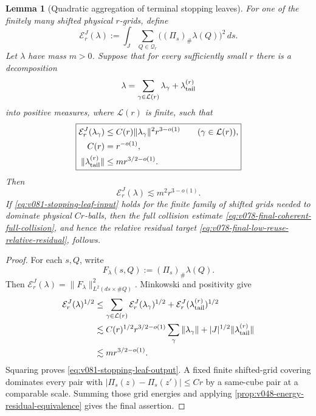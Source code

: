 \documentclass[10pt]{article}
\newtheorem{lemma}[theorem]{Lemma}
\begin{document}
\begin{lemma}[Quadratic aggregation of terminal stopping leaves]
\label{lem:v081-stopping-leaf-quadratic-aggregation}
For one of the finitely many shifted physical \(r\)-grids, define
\[
\mathcal E_r^J(\lambda)
:=
\int_J\sum_{Q\in\mathcal Q_r}
\bigl((\Pi_s)_\#\lambda(Q)\bigr)^2\,ds.
\]
Let \(\lambda\) have mass \(m>0\).  Suppose that for every sufficiently small \(r\) there is a
decomposition
\[
\lambda=\sum_{\gamma\in\mathcal L(r)}\lambda_\gamma+\lambda_{\rm tail}^{(r)}
\]
into positive measures, where \(\mathcal L(r)\) is finite, such that
\begin{equation}
\label{eq:v081-stopping-leaf-input}
\boxed{
\begin{aligned}
\mathcal E_r^J(\lambda_\gamma)
&\le
C(r)\|\lambda_\gamma\|^2r^{3-o(1)}
\qquad(\gamma\in\mathcal L(r)),\\
C(r)&=r^{-o(1)},\\
\|\lambda_{\rm tail}^{(r)}\|
&\le
mr^{3/2-o(1)}.
\end{aligned}
}
\end{equation}
Then
\begin{equation}
\label{eq:v081-stopping-leaf-output}
\boxed{
\mathcal E_r^J(\lambda)
\lesssim
m^2r^{3-o(1)}.
}
\end{equation}
If \eqref{eq:v081-stopping-leaf-input} holds for the finite family of shifted grids needed to
dominate physical \(Cr\)-balls, then the full collision estimate
\eqref{eq:v078-final-coherent-full-collision}, and hence the relative residual target
\eqref{eq:v078-final-low-reuse-relative-residual}, follows.
\end{lemma}

\begin{proof}
For each \(s,Q\), write
\[
F_\lambda(s,Q):=(\Pi_s)_\#\lambda(Q).
\]
Then \(\mathcal E_r^J(\lambda)=\|F_\lambda\|_{L^2(ds\times\#Q)}^2\).
Minkowski and positivity give
\[
\begin{aligned}
\mathcal E_r^J(\lambda)^{1/2}
&\le
\sum_{\gamma\in\mathcal L(r)}
\mathcal E_r^J(\lambda_\gamma)^{1/2}
+
\mathcal E_r^J(\lambda_{\rm tail}^{(r)})^{1/2}\\
&\lesssim
C(r)^{1/2}r^{3/2-o(1)}
\sum_\gamma\|\lambda_\gamma\|
+
|J|^{1/2}\|\lambda_{\rm tail}^{(r)}\|\\
&\lesssim
mr^{3/2-o(1)}.
\end{aligned}
\]
Squaring proves \eqref{eq:v081-stopping-leaf-output}.  A fixed finite shifted-grid covering
dominates every pair with
\(|\Pi_s(z)-\Pi_s(z')|\le Cr\) by a same-cube pair at a comparable scale.  Summing those grid
energies and applying
\cref{prop:v048-energy-residual-equivalence} gives the final assertion.
\end{proof}
\end{document}
